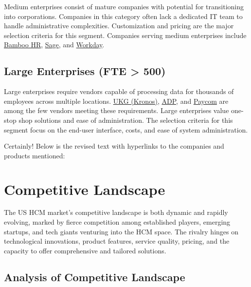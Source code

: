 \documentclass[
  a4paper,
]{book}
\begin{document}
Medium enterprises consist of mature companies with potential for
transitioning into corporations. Companies in this category often lack a
dedicated IT team to handle administrative complexities. Customization
and pricing are the major selection criteria for this segment. Companies
serving medium enterprises include
\href{https://www.bamboohr.com/}{Bamboo HR},
\href{https://www.sage.com/}{Sage}, and
\href{https://www.workday.com/}{Workday}.

\hypertarget{large-enterprises-fte-500}{%
\subsection{Large Enterprises (FTE \textgreater{}
500)}\label{large-enterprises-fte-500}}

Large enterprises require vendors capable of processing data for
thousands of employees across multiple locations.
\href{https://www.ukg.com/}{UKG (Kronos)},
\href{https://www.adp.com/}{ADP}, and
\href{https://www.paycom.com/}{Paycom} are among the few vendors meeting
these requirements. Large enterprises value one-stop shop solutions and
ease of administration. The selection criteria for this segment focus on
the end-user interface, costs, and ease of system administration.

Certainly! Below is the revised text with hyperlinks to the companies
and products mentioned:

\hypertarget{competitive-landscape}{%
\section{Competitive Landscape}\label{competitive-landscape}}

The US HCM market's competitive landscape is both dynamic and rapidly
evolving, marked by fierce competition among established players,
emerging startups, and tech giants venturing into the HCM space. The
rivalry hinges on technological innovations, product features, service
quality, pricing, and the capacity to offer comprehensive and tailored
solutions.

\hypertarget{analysis-of-competitive-landscape}{%
\subsection{Analysis of Competitive
Landscape}\label{analysis-of-competitive-landscape}}
\end{document}
